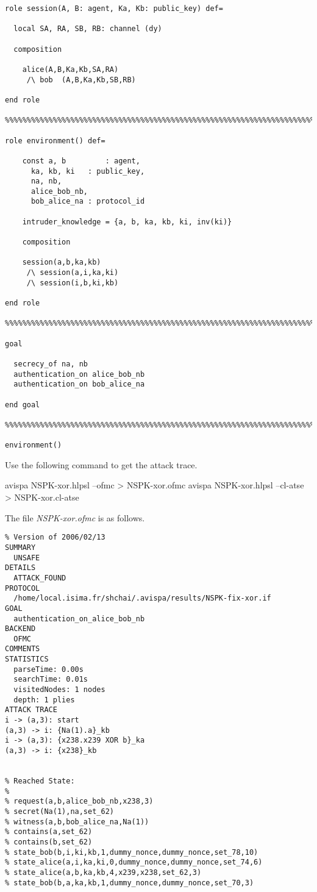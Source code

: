 \documentclass[a4paper, 12pt]{report}
\begin{document}
\begin{lstlisting}[frame=single]
role session(A, B: agent, Ka, Kb: public_key) def=

  local SA, RA, SB, RB: channel (dy)

  composition 

	alice(A,B,Ka,Kb,SA,RA)
     /\ bob  (A,B,Ka,Kb,SB,RB)

end role

%%%%%%%%%%%%%%%%%%%%%%%%%%%%%%%%%%%%%%%%%%%%%%%%%%%%%%%%%%%%%%%%%%%%%%%%

role environment() def=

    const a, b	       : agent,
	  ka, kb, ki   : public_key,
	  na, nb,
	  alice_bob_nb,
	  bob_alice_na : protocol_id

    intruder_knowledge = {a, b, ka, kb, ki, inv(ki)}

    composition

	session(a,b,ka,kb)
     /\ session(a,i,ka,ki)
     /\ session(i,b,ki,kb)

end role

%%%%%%%%%%%%%%%%%%%%%%%%%%%%%%%%%%%%%%%%%%%%%%%%%%%%%%%%%%%%%%%%%%%%%%%%

goal

  secrecy_of na, nb
  authentication_on alice_bob_nb
  authentication_on bob_alice_na

end goal

%%%%%%%%%%%%%%%%%%%%%%%%%%%%%%%%%%%%%%%%%%%%%%%%%%%%%%%%%%%%%%%%%%%%%%%%

environment()
        \end{lstlisting}
        Use the following command to get the attack trace.
        \begin{commandshell}
avispa NSPK-xor.hlpsl --ofmc > NSPK-xor.ofmc
avispa NSPK-xor.hlpsl --cl-atse > NSPK-xor.cl-atse
        \end{commandshell}
        The file \emph{NSPK-xor.ofmc} is as follows.
        \begin{lstlisting}[frame=single]
% OFMC
% Version of 2006/02/13
SUMMARY
  UNSAFE
DETAILS
  ATTACK_FOUND
PROTOCOL
  /home/local.isima.fr/shchai/.avispa/results/NSPK-fix-xor.if
GOAL
  authentication_on_alice_bob_nb
BACKEND
  OFMC
COMMENTS
STATISTICS
  parseTime: 0.00s
  searchTime: 0.01s
  visitedNodes: 1 nodes
  depth: 1 plies
ATTACK TRACE
i -> (a,3): start
(a,3) -> i: {Na(1).a}_kb
i -> (a,3): {x238.x239 XOR b}_ka
(a,3) -> i: {x238}_kb


% Reached State:
% 
% request(a,b,alice_bob_nb,x238,3)
% secret(Na(1),na,set_62)
% witness(a,b,bob_alice_na,Na(1))
% contains(a,set_62)
% contains(b,set_62)
% state_bob(b,i,ki,kb,1,dummy_nonce,dummy_nonce,set_78,10)
% state_alice(a,i,ka,ki,0,dummy_nonce,dummy_nonce,set_74,6)
% state_alice(a,b,ka,kb,4,x239,x238,set_62,3)
% state_bob(b,a,ka,kb,1,dummy_nonce,dummy_nonce,set_70,3)
        \end{lstlisting}
\end{document}
